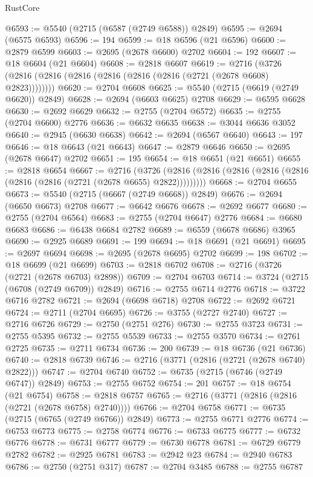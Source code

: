 \begin{lexlean}{RustCore}
\begin{coremodule}
@6593 := @5540 (@2715 (@6587 (@2749 @6588)) @2849)
@6595 := @2694 (@6575 @6593)
@6596 := 194
@6599 := @18 @6596 (@21 @6596)
@6600 := @2879 @6599
@6603 := @2695 (@2678 @6600) @2702
@6604 := 192
@6607 := @18 @6604 (@21 @6604)
@6608 := @2818 @6607
@6619 := @2716 (@3726 (@2816 (@2816 (@2816 (@2816 (@2816 (@2816 (@2721 (@2678 @6608) @2823))))))))
@6620 := @2704 @6608
@6625 := @5540 (@2715 (@6619 (@2749 @6620)) @2849)
@6628 := @2694 (@6603 @6625) @2708
@6629 := @6595 @6628
@6630 := @2692 @6629
@6632 := @2755 (@2704 @6572)
@6635 := @2755 (@2704 @6600) @2776
@6636 := @6632 @6635
@6638 := @3044 @6636 @3052
@6640 := @2945 (@6630 @6638)
@6642 := @2694 (@6567 @6640)
@6643 := 197
@6646 := @18 @6643 (@21 @6643)
@6647 := @2879 @6646
@6650 := @2695 (@2678 @6647) @2702
@6651 := 195
@6654 := @18 @6651 (@21 @6651)
@6655 := @2818 @6654
@6667 := @2716
    (@3726 (@2816 (@2816 (@2816 (@2816 (@2816 (@2816 (@2816 (@2721 (@2678 @6655) @2822)))))))))
@6668 := @2704 @6655
@6673 := @5540 (@2715 (@6667 (@2749 @6668)) @2849)
@6676 := @2694 (@6650 @6673) @2708
@6677 := @6642 @6676
@6678 := @2692 @6677
@6680 := @2755 (@2704 @6564)
@6683 := @2755 (@2704 @6647) @2776
@6684 := @6680 @6683
@6686 := @6438 @6684 @2782
@6689 := @6559 (@6678 @6686) @3965
@6690 := @2925 @6689
@6691 := 199
@6694 := @18 @6691 (@21 @6691)
@6695 := @2697 @6694
@6698 := @2695 (@2678 @6695) @2702
@6699 := 198
@6702 := @18 @6699 (@21 @6699)
@6703 := @2818 @6702
@6708 := @2716 (@3726 (@2721 (@2678 @6703) @2898))
@6709 := @2704 @6703
@6714 := @3724 (@2715 (@6708 (@2749 @6709)) @2849)
@6716 := @2755 @6714 @2776
@6718 := @3722 @6716 @2782
@6721 := @2694 (@6698 @6718) @2708
@6722 := @2692 @6721
@6724 := @2711 (@2704 @6695)
@6726 := @3755 (@2727 @2740)
@6727 := @2716 @6726
@6729 := @2750 (@2751 @276)
@6730 := @2755 @3723
@6731 := @2755 @5395
@6732 := @2755 @5539
@6733 := @2755 @3570
@6734 := @2761 @2725
@6735 := @2711 @6734
@6736 := 200
@6739 := @18 @6736 (@21 @6736)
@6740 := @2818 @6739
@6746 := @2716 (@3771 (@2816 (@2721 (@2678 @6740) @2822)))
@6747 := @2704 @6740
@6752 := @6735 (@2715 (@6746 (@2749 @6747)) @2849)
@6753 := @2755 @6752
@6754 := 201
@6757 := @18 @6754 (@21 @6754)
@6758 := @2818 @6757
@6765 := @2716 (@3771 (@2816 (@2816 (@2721 (@2678 @6758) @2740))))
@6766 := @2704 @6758
@6771 := @6735 (@2715 (@6765 (@2749 @6766)) @2849)
@6773 := @2755 @6771 @2776
@6774 := @6753 @6773
@6775 := @2758 @6774
@6776 := @6733 @6775
@6777 := @6732 @6776
@6778 := @6731 @6777
@6779 := @6730 @6778
@6781 := @6729 @6779 @2782
@6782 := @2925 @6781
@6783 := @2942 @23
@6784 := @2940 @6783
@6786 := @2750 (@2751 @317)
@6787 := @2704 @3485
@6788 := @2755 @6787

\end{coremodule}
\end{lexlean}
